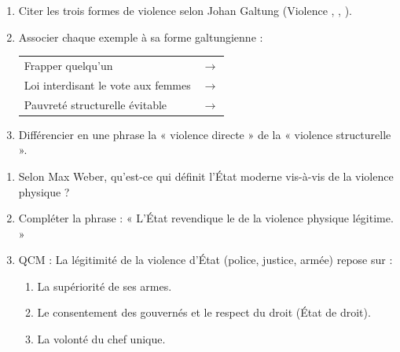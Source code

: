 \documentclass[11pt]{article}
\begin{document}
\begin{exercice}
\begin{enumerate}
    \item Citer les trois formes de violence selon Johan Galtung (Violence \underline{\hspace{3cm}}, \underline{\hspace{3cm}}, \underline{\hspace{3cm}}).
    \item Associer chaque exemple à sa forme galtungienne :
    \begin{tabular}{ll}
        Frapper quelqu'un & $\rightarrow$ \underline{\hspace{4cm}} \\
        Loi interdisant le vote aux femmes & $\rightarrow$ \underline{\hspace{4cm}} \\
        Pauvreté structurelle évitable & $\rightarrow$ \underline{\hspace{4cm}}
    \end{tabular}
    \item Différencier en une phrase la « violence directe » de la « violence structurelle ».
\end{enumerate}
\end{exercice}

\begin{exercice}
\begin{enumerate}
    \item Selon Max Weber, qu'est-ce qui définit l'État moderne vis-à-vis de la violence physique ?
    \item Compléter la phrase : « L'État revendique le \underline{\hspace{4cm}} de la violence physique légitime. »
    \item QCM : La légitimité de la violence d'État (police, justice, armée) repose sur :
    \begin{enumerate}
        \item La supériorité de ses armes.
        \item Le consentement des gouvernés et le respect du droit (État de droit).
        \item La volonté du chef unique.
    \end{enumerate}
\end{enumerate}
\end{exercice}
\end{document}

